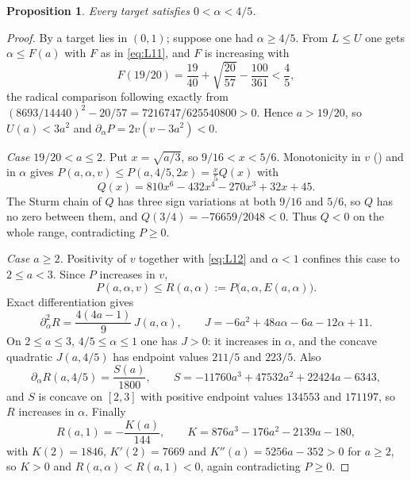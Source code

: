 \documentclass[11pt,reqno]{amsart}
\theoremstyle{plain}
\newtheorem{proposition}[theorem]{Proposition}
\theoremstyle{definition}
\theoremstyle{remark}
\numberwithin{equation}{section}
\begin{document}
\begin{proposition}
  \label{prop:below-45}
  Every target satisfies $0<\alpha<4/5$.
\end{proposition}

\begin{proof}
  By  a target lies in $(0,1)$;
  suppose one had $\alpha\ge4/5$. From $L\le U$ one gets $\alpha\le F(a)$
  with $F$ as in \eqref{eq:L11}, and $F$ is increasing with
  \begin{equation*}
    F(19/20)=\frac{19}{40}+\sqrt{\frac{20}{57}}-\frac{100}{361}<\frac45,
  \end{equation*}
  the radical comparison following exactly from
  $(8693/14440)^2-20/57=7216747/625540800>0$. Hence $a>19/20$, so
  $U(a)<3a^2$ and $\partial_\alpha P=2v(v-3a^2)<0$.

  \emph{Case $19/20<a\le2$.} Put $x=\sqrt{a/3}$, so $9/16<x<5/6$.
  Monotonicity in $v$ () and in $\alpha$ gives
  $P(a,\alpha,v)\le P(a,4/5,2x)=\tfrac x5Q(x)$ with
  \begin{equation}
    \label{eq:Q}
    Q(x)=810x^6-432x^4-270x^3+32x+45 .
  \end{equation}
  The Sturm chain of $Q$ has three sign variations at both $9/16$ and
  $5/6$, so $Q$ has no zero between them, and $Q(3/4)=-76659/2048<0$. Thus
  $Q<0$ on the whole range, contradicting $P\ge0$.

  \emph{Case $a\ge2$.} Positivity of $v$ together with \eqref{eq:L12} and
  $\alpha<1$ confines this case to $2\le a<3$. Since $P$ increases in $v$,
  \begin{equation*}
    P(a,\alpha,v)\le R(a,\alpha):=P\bigl(a,\alpha,E(a,\alpha)\bigr).
  \end{equation*}
  Exact differentiation gives
  \begin{equation}
    \label{eq:L15}
    \partial_\alpha^2R=\frac{4(4a-1)}9\,J(a,\alpha),
    \qquad
    J=-6a^2+48a\alpha-6a-12\alpha+11 .
  \end{equation}
  On $2\le a\le3$, $4/5\le\alpha\le1$ one has $J>0$: it increases in
  $\alpha$, and the concave quadratic $J(a,4/5)$ has endpoint values
  $211/5$ and $223/5$. Also
  \begin{equation*}
    \partial_\alpha R(a,4/5)=\frac{S(a)}{1800},
    \qquad
    S=-11760a^3+47532a^2+22424a-6343,
  \end{equation*}
  and $S$ is concave on $[2,3]$ with positive endpoint values $134553$ and
  $171197$, so $R$ increases in $\alpha$. Finally
  \begin{equation*}
    R(a,1)=-\frac{K(a)}{144},
    \qquad
    K=876a^3-176a^2-2139a-180,
  \end{equation*}
  with $K(2)=1846$, $K'(2)=7669$ and $K''(a)=5256a-352>0$ for $a\ge2$, so
  $K>0$ and $R(a,\alpha)<R(a,1)<0$, again contradicting $P\ge0$.
\end{proof}
\end{document}
